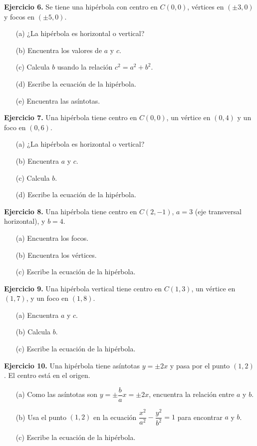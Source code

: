 \documentclass[12pt,a4paper]{article}
\begin{document}
	\textbf{Ejercicio 6.} Se tiene una hipérbola con centro en $C(0,0)$, vértices en $(\pm 3,0)$ y focos en $(\pm 5,0)$.
	\begin{itemize}
		\item[(a)] ¿La hipérbola es horizontal o vertical?
		\item[(b)] Encuentra los valores de $a$ y $c$.
		\item[(c)] Calcula $b$ usando la relación $c^2=a^2+b^2$.
		\item[(d)] Escribe la ecuación de la hipérbola.
		\item[(e)] Encuentra las asíntotas.
	\end{itemize}

	\bigskip

	\textbf{Ejercicio 7.} Una hipérbola tiene centro en $C(0,0)$, un vértice en $(0,4)$ y un foco en $(0,6)$.
	\begin{itemize}
		\item[(a)] ¿La hipérbola es horizontal o vertical?
		\item[(b)] Encuentra $a$ y $c$.
		\item[(c)] Calcula $b$.
		\item[(d)] Escribe la ecuación de la hipérbola.
	\end{itemize}

	\bigskip

	\textbf{Ejercicio 8.} Una hipérbola tiene centro en $C(2,-1)$, $a=3$ (eje transversal horizontal), y $b=4$.
	\begin{itemize}
		\item[(a)] Encuentra los focos.
		\item[(b)] Encuentra los vértices.
		\item[(c)] Escribe la ecuación de la hipérbola.
	\end{itemize}

	\bigskip

	\textbf{Ejercicio 9.} Una hipérbola vertical tiene centro en $C(1,3)$, un vértice en $(1,7)$, y un foco en $(1,8)$.
	\begin{itemize}
		\item[(a)] Encuentra $a$ y $c$.
		\item[(b)] Calcula $b$.
		\item[(c)] Escribe la ecuación de la hipérbola.
	\end{itemize}

	\bigskip

	\textbf{Ejercicio 10.} Una hipérbola tiene asíntotas $y=\pm 2x$ y pasa por el punto $(1,2)$. El centro está en el origen.
	\begin{itemize}
		\item[(a)] Como las asíntotas son $y=\pm\dfrac{b}{a}x=\pm 2x$, encuentra la relación entre $a$ y $b$.
		\item[(b)] Usa el punto $(1,2)$ en la ecuación $\dfrac{x^2}{a^2}-\dfrac{y^2}{b^2}=1$ para encontrar $a$ y $b$.
		\item[(c)] Escribe la ecuación de la hipérbola.
	\end{itemize}
\end{document}
